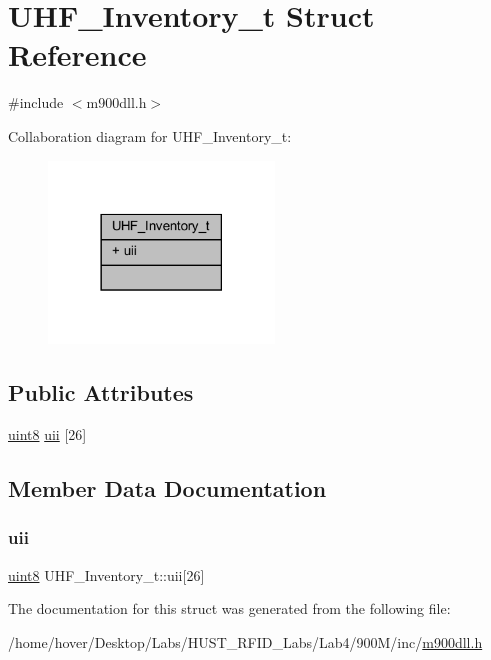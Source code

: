 \hypertarget{struct_u_h_f___inventory__t}{}\section{U\+H\+F\+\_\+\+Inventory\+\_\+t Struct Reference}
\label{struct_u_h_f___inventory__t}


{\ttfamily \#include $<$m900dll.\+h$>$}



Collaboration diagram for U\+H\+F\+\_\+\+Inventory\+\_\+t\+:
\nopagebreak
\begin{figure}[H]
\begin{center}
\leavevmode
\includegraphics[width=170pt]{struct_u_h_f___inventory__t__coll__graph}
\end{center}
\end{figure}
\subsection*{Public Attributes}
\begin{DoxyCompactItemize}
\item 
\mbox{\hyperlink{m900dll_8h_adde6aaee8457bee49c2a92621fe22b79}{uint8}} \mbox{\hyperlink{struct_u_h_f___inventory__t_aa3e9f1029ad7b35c8d702fbc088b813c}{uii}} \mbox{[}26\mbox{]}
\end{DoxyCompactItemize}


\subsection{Member Data Documentation}
\mbox{\label{struct_u_h_f___inventory__t_aa3e9f1029ad7b35c8d702fbc088b813c}} 
\subsubsection{\texorpdfstring{uii}{uii}}
{\footnotesize\ttfamily \mbox{\hyperlink{m900dll_8h_adde6aaee8457bee49c2a92621fe22b79}{uint8}} U\+H\+F\+\_\+\+Inventory\+\_\+t\+::uii\mbox{[}26\mbox{]}}



The documentation for this struct was generated from the following file\+:\begin{DoxyCompactItemize}
\item 
/home/hover/\+Desktop/\+Labs/\+H\+U\+S\+T\+\_\+\+R\+F\+I\+D\+\_\+\+Labs/\+Lab4/900\+M/inc/\mbox{\hyperlink{m900dll_8h}{m900dll.\+h}}\end{DoxyCompactItemize}
